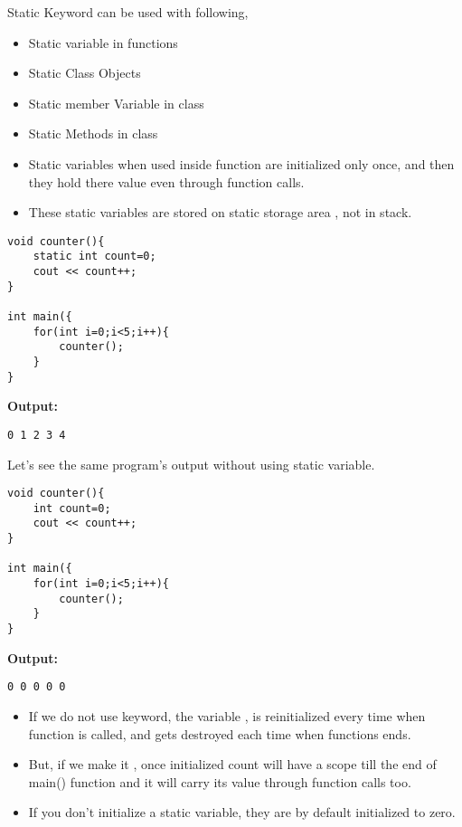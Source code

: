 \newpage
{}
\label{sec:static-keyword}


Static Keyword can be used with following,

\begin{itemize}
    \item Static variable in functions
    \item Static Class Objects
    \item Static member Variable in class
    \item Static Methods in class
\end{itemize}


\begin{itemize}
\tightlist
    \item Static variables when used inside function are initialized only once, and then they hold there value even through function calls.
    \item These static variables are stored on static storage area , not in stack.
\end{itemize}

\begin{verbatim}
void counter(){
    static int count=0;
    cout << count++;
}

int main({
    for(int i=0;i<5;i++){
        counter();
    }
}
\end{verbatim}

\textbf{Output:}
\begin{verbatim}
0 1 2 3 4
\end{verbatim}


Let's see the same program's output without using static variable.

\begin{verbatim}
void counter(){
    int count=0;
    cout << count++;
}

int main({
    for(int i=0;i<5;i++){
        counter();
    }
}
\end{verbatim}

\textbf{Output:}
\begin{verbatim}
0 0 0 0 0
\end{verbatim}

\begin{itemize}
\tightlist
    \item If we do not use  keyword, the variable , is reinitialized every time when  function is called, and gets destroyed each time when  functions ends.
    \item But, if we make it , once initialized count will have a scope till the end of main() function and it will carry its value through function calls too.
    \item If you don't initialize a static variable, they are by default initialized to zero.
\end{itemize}


